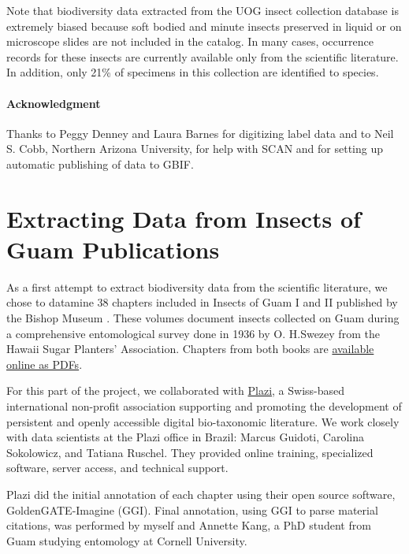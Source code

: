 \documentclass[12pt,letterpaper,english,bibliography=totocnumbered, abstract=on]{scrartcl}
\begin{document}
Note that biodiversity data extracted from the UOG insect collection database is extremely biased because soft bodied and minute insects preserved in liquid or on microscope slides are not included in the catalog. In many cases, occurrence records for these insects are currently available only from the scientific literature. In addition, only 21\% of specimens in this collection are identified to species.

\paragraph{Acknowledgment} Thanks to Peggy Denney and Laura Barnes for digitizing label data and to Neil S. Cobb, Northern Arizona University, for help with SCAN and for setting up automatic publishing of data to GBIF.





\pagebreak
\section{Extracting Data from Insects of Guam Publications}
\newrefsection[my.bib]

As a first attempt to extract biodiversity data from the scientific literature, we chose to datamine 38 chapters included in Insects of Guam I and II published by the Bishop Museum \cite{swezey1942insects, swezey1946insects}. These volumes document insects collected on Guam during a comprehensive entomological survey done in 1936 by O. H.Swezey from the Hawaii Sugar Planters' Association. Chapters from both books are \href{http://hbs.bishopmuseum.org/pubs-online/bpbm-bulletins.html}{available online as PDFs}.

For this part of the project, we collaborated with \href{https://en.wikipedia.org/wiki/Plazi}{Plazi}, a Swiss-based international non-profit association supporting and promoting the development of persistent and openly accessible digital bio-taxonomic literature. We work closely with data scientists at the Plazi office in Brazil: Marcus Guidoti, Carolina Sokolowicz, and Tatiana Ruschel. They provided online training, specialized software, server access, and technical support.

Plazi did the initial annotation of each chapter using their open source software, GoldenGATE-Imagine (GGI). Final annotation, using GGI to parse material citations, was performed by myself and Annette Kang, a PhD student from Guam studying entomology at Cornell University.
\end{document}
